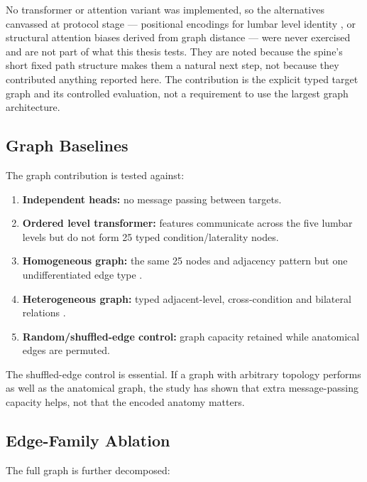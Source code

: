 No transformer or attention variant was implemented, so the alternatives
canvassed at protocol stage --- positional encodings for lumbar level identity
\cite{dwivedi2021generalization}, or structural attention biases derived from
graph distance \cite{ying2021transformers} --- were never exercised and are not
part of what this thesis tests. They are noted because the spine's short fixed
path structure makes them a natural next step, not because they contributed
anything reported here. The contribution is the explicit typed target graph and
its
controlled evaluation, not a requirement to use the largest graph
architecture.

\subsection{Graph Baselines}
\label{sec:method-graph-baselines}

The graph contribution is tested against:

\begin{enumerate}
  \item \textbf{Independent heads:} no message passing between targets.
  \item \textbf{Ordered level transformer:} features communicate across the five
        lumbar levels but do not form 25 typed condition/laterality nodes.
  \item \textbf{Homogeneous graph:} the same 25 nodes and adjacency pattern but
        one undifferentiated edge type
        \cite{kipf2017semisupervised,velickovic2018graph}.
  \item \textbf{Heterogeneous graph:} typed adjacent-level, cross-condition and
        bilateral relations
        \cite{schlichtkrull2018modeling,hu2020heterogeneous}.
  \item \textbf{Random/shuffled-edge control:} graph capacity retained while
        anatomical edges are permuted.
\end{enumerate}

The shuffled-edge control is essential. If a graph with arbitrary topology
performs as well as the anatomical graph, the study has shown that extra
message-passing capacity helps, not that the encoded anatomy matters.

\subsection{Edge-Family Ablation}
\label{sec:method-edge-ablation}

The full graph is further decomposed:

